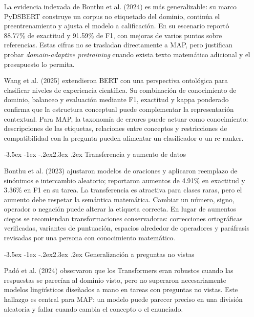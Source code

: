 \documentclass[11pt,oneside,openany]{book}
\makeatletter
\renewcommand\section{\@startsection{section}{1}{\z@}%
  {-3.5ex \@plus -1ex \@minus -.2ex}{2.3ex \@plus .2ex}%
  {\normalfont\Large\sffamily\bfseries\color{AzulMedio}}}
\makeatother
\begin{document}
La evidencia indexada de Bonthu et al. (2024) es más generalizable: su marco
PyDSBERT construye un corpus no etiquetado del dominio, continúa el preentrenamiento
y ajusta el modelo a calificación. En su escenario reportó 88.77\% de exactitud y
91.59\% de F1, con mejoras de varios puntos sobre referencias. Estas cifras no se
trasladan directamente a MAP, pero justifican probar \emph{domain-adaptive
pretraining} cuando exista texto matemático adicional y el presupuesto lo permita.

Wang et al. (2025) extendieron BERT con una perspectiva ontológica para clasificar
niveles de experiencia científica. Su combinación de conocimiento de dominio,
balanceo y evaluación mediante F1, exactitud y kappa ponderado confirma que la
estructura conceptual puede complementar la representación contextual. Para MAP,
la taxonomía de errores puede actuar como conocimiento: descripciones de las
etiquetas, relaciones entre conceptos y restricciones de compatibilidad con la
pregunta pueden alimentar un clasificador o un re-ranker.

\section{Transferencia y aumento de datos}

Bonthu et al. (2023) ajustaron modelos de oraciones y aplicaron reemplazo de
sinónimos e intercambio aleatorio; reportaron aumentos de 4.91\% en exactitud y
3.36\% en F1 en su tarea. La transferencia es atractiva para clases raras, pero el
aumento debe respetar la semántica matemática. Cambiar un número, signo, operador
o negación puede alterar la etiqueta correcta. En lugar de aumentos ciegos se
recomiendan transformaciones conservadoras: correcciones ortográficas verificadas,
variantes de puntuación, espacios alrededor de operadores y paráfrasis revisadas
por una persona con conocimiento matemático.

\section{Generalización a preguntas no vistas}

Padó et al. (2024) observaron que los Transformers eran robustos cuando las
respuestas se parecían al dominio visto, pero no superaron necesariamente modelos
lingüísticos diseñados a mano en tareas con preguntas no vistas. Este hallazgo es
central para MAP: un modelo puede parecer preciso en una división aleatoria y
fallar cuando cambia el concepto o el enunciado.
\end{document}
